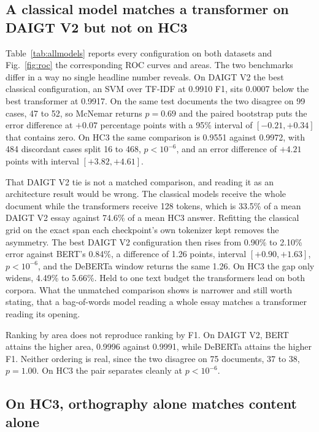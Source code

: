 \subsection{A classical model matches a transformer on DAIGT V2 but not on HC3}

Table~\ref{tab:allmodels} reports every configuration on both datasets and Fig.~\ref{fig:roc} the corresponding ROC curves and areas. The two benchmarks differ in a way no single headline number reveals. On DAIGT V2 the best classical configuration, an SVM over TF-IDF at 0.9910 F1, sits 0.0007 below the best transformer at 0.9917. On the same test documents the two disagree on 99 cases, 47 to 52, so McNemar returns $p=0.69$ and the paired bootstrap puts the error difference at $+0.07$ percentage points with a 95\% interval of $[-0.21, +0.34]$ that contains zero. On HC3 the same comparison is 0.9551 against 0.9972, with 484 discordant cases split 16 to 468, $p < 10^{-6}$, and an error difference of $+4.21$ points with interval $[+3.82, +4.61]$.

That DAIGT V2 tie is not a matched comparison, and reading it as an architecture result would be wrong. The classical models receive the whole document while the transformers receive 128 tokens, which is 33.5\% of a mean DAIGT V2 essay against 74.6\% of a mean HC3 answer. Refitting the classical grid on the exact span each checkpoint's own tokenizer kept removes the asymmetry. The best DAIGT V2 configuration then rises from 0.90\% to 2.10\% error against BERT's 0.84\%, a difference of 1.26 points, interval $[+0.90, +1.63]$, $p < 10^{-6}$, and the DeBERTa window returns the same 1.26. On HC3 the gap only widens, 4.49\% to 5.66\%. Held to one text budget the transformers lead on both corpora. What the unmatched comparison shows is narrower and still worth stating, that a bag-of-words model reading a whole essay matches a transformer reading its opening.

Ranking by area does not reproduce ranking by F1. On DAIGT V2, BERT attains the higher area, 0.9996 against 0.9991, while DeBERTa attains the higher F1. Neither ordering is real, since the two disagree on 75 documents, 37 to 38, $p=1.00$. On HC3 the pair separates cleanly at $p < 10^{-6}$.

\subsection{On HC3, orthography alone matches content alone}

